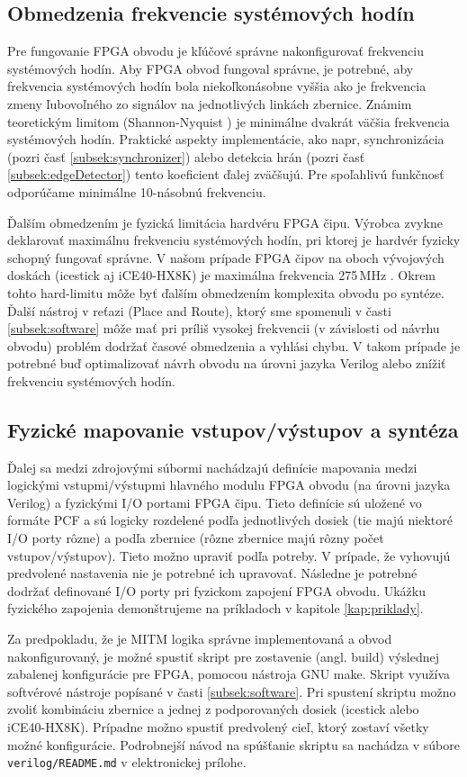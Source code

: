 \subsection{Obmedzenia frekvencie systémových hodín} \label{subsek:sysFreq}
Pre fungovanie FPGA obvodu je kľúčové správne nakonfigurovať frekvenciu systémových hodín. Aby FPGA obvod fungoval správne, je potrebné, aby frekvencia systémových hodín bola niekoľkonásobne vyššia ako je frekvencia zmeny ľubovoľného zo signálov na jednotlivých linkách zbernice. Známim teoretickým limitom (Shannon-Nyquist \cite{shannonNyquist}) je minimálne dvakrát väčšia frekvencia systémových hodín. Praktické aspekty implementácie, ako napr, synchronizácia (pozri časť \ref{subsek:synchronizer}) alebo detekcia hrán (pozri časť \ref{subsek:edgeDetector}) tento koeficient ďalej zväčšujú. Pre spoľahlivú funkčnosť odporúčame minimálne 10-násobnú frekvenciu.

Ďalším obmedzením je fyzická limitácia hardvéru FPGA čipu. Výrobca zvykne deklarovať maximálnu frekvenciu systémových hodín, pri ktorej je hardvér fyzicky schopný fungovať správne. V našom prípade FPGA čipov na oboch vývojových doskách (icestick aj iCE40-HX8K) je maximálna frekvencia 275\,MHz \cite{lphxFamily}. Okrem tohto hard-limitu môže byť ďalším obmedzením komplexita obvodu po syntéze. Ďalší nástroj v reťazi (Place and Route), ktorý sme spomenuli v časti \ref{subsek:software} môže mať pri príliš vysokej frekvencii (v závislosti od návrhu obvodu) problém dodržať časové obmedzenia a vyhlási chybu. V takom prípade je potrebné buď optimalizovať návrh obvodu na úrovni jazyka Verilog alebo znížiť frekvenciu systémových hodín.

\subsection{Fyzické mapovanie vstupov/výstupov a syntéza}
Ďalej sa medzi zdrojovými súbormi nachádzajú definície mapovania medzi logickými vstupmi/výstupmi hlavného modulu FPGA obvodu (na úrovni jazyka Verilog) a fyzickými I/O portami FPGA čipu. Tieto definície sú uložené vo formáte PCF a sú logicky rozdelené podľa jednotlivých dosiek (tie majú niektoré I/O porty rôzne) a podľa zbernice (rôzne zbernice majú rôzny počet vstupov/výstupov). Tieto možno upraviť podľa potreby. V prípade, že vyhovujú predvolené nastavenia nie je potrebné ich upravovať. Následne je potrebné dodržať definované I/O porty pri fyzickom zapojení FPGA obvodu. Ukážku fyzického zapojenia demonštrujeme na príkladoch v kapitole \ref{kap:priklady}. 

Za predpokladu, že je MITM logika správne implementovaná a obvod nakonfigurovaný, je možné spustiť skript pre zostavenie (angl. build) výslednej zabalenej konfigurácie pre FPGA, pomocou nástroja GNU make. Skript využíva softvérové nástroje popísané v časti \ref{subsek:software}. Pri spustení skriptu možno zvoliť kombináciu zbernice a jednej z podporovaných dosiek (icestick alebo iCE40-HX8K). Prípadne možno spustiť predvolený cieľ, ktorý zostaví všetky možné konfigurácie. Podrobnejší návod na spúšťanie skriptu sa nachádza v súbore \texttt{verilog/README.md} v elektronickej prílohe.